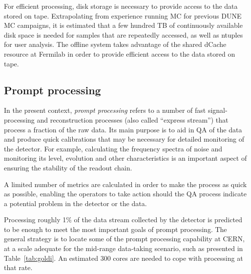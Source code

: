 For efficient processing, disk storage is necessary to provide access to the data stored on tape.
Extrapolating from experience running MC for previous DUNE MC campaigns,
it is estimated that  a few hundred TB of continuously available disk space is needed for samples that are repeatedly
accessed, as well as ntuples for user analysis.  The offline system takes advantage of the shared dCache resource 
at Fermilab in order to provide efficient access to the data stored on tape.


\subsection{Prompt processing}
\label{sec:prompt_processing}

In the present context, \textit{prompt processing} refers to a number of fast signal-processing and reconstruction processes
(also called ``express stream'') that process a fraction of the raw data. Its main purpose is to aid in QA of the data
and produce quick calibrations that may be necessary for detailed monitoring of the detector. For example,
calculating the frequency spectra of noise and monitoring its level, evolution and other characteristics is an important aspect of ensuring
the stability of the readout chain.

A limited number of metrics are calculated in order to make the process as quick as possible, enabling
the operators to take action should the QA process indicate a potential problem in the detector or the data.

Processing roughly 1\% of the data stream collected by the detector is predicted to
be enough to meet the most important goals of prompt processing. 
The general strategy is to locate some of the prompt processing capability at CERN, at a scale adequate for the mid-range
data-taking scenario, such as presented in Table~\ref{tab:goldi}. An estimated 300 cores
are needed to cope with processing at that rate.

